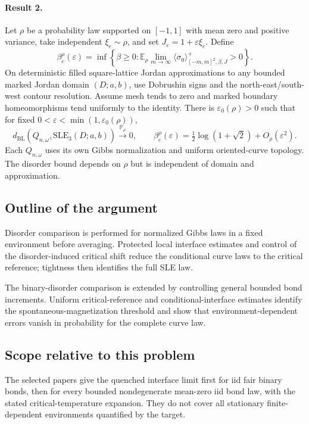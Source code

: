 \documentclass[11pt]{article}
\begin{document}
\paragraph{Result 2.} Let $\rho$ be a probability law supported on $[-1,1]$ with mean zero and positive variance, take independent $\xi_e\sim\rho$, and set $J_e=1+\varepsilon\xi_e$. Define
\[
 \beta_c^\rho(\varepsilon)=\inf\left\{\beta\ge0:
 \mathbb E_\rho\lim_{m\to\infty}\langle\sigma_0\rangle^+_{[-m,m]^2,\beta,J}>0\right\}.
\]
On deterministic filled square-lattice Jordan approximations to any bounded marked Jordan domain $(D;a,b)$, use Dobrushin signs and the north-east/south-west contour resolution. Assume mesh tends to zero and marked boundary homeomorphisms tend uniformly to the identity. There is $\varepsilon_0(\rho)>0$ such that for fixed $0<\varepsilon<\min(1,\varepsilon_0(\rho))$,
\[
 d_{\mathrm{BL}}(Q_{n,\omega},\mathrm{SLE}_3(D;a,b))\xrightarrow{\mathbb P_\rho}0,
 \qquad
 \beta_c^\rho(\varepsilon)=\tfrac12\log(1+\sqrt2)+O_\rho(\varepsilon^2).
\]
Each $Q_{n,\omega}$ uses its own Gibbs normalization and uniform oriented-curve topology. The disorder bound depends on $\rho$ but is independent of domain and approximation.

\subsection{Outline of the argument}
Disorder comparison is performed for normalized Gibbs laws in a fixed environment before averaging. Protected local interface estimates and control of the disorder-induced critical shift reduce the conditional curve laws to the critical reference; tightness then identifies the full SLE law.

The binary-disorder comparison is extended by controlling general bounded bond increments. Uniform critical-reference and conditional-interface estimates identify the spontaneous-magnetization threshold and show that environment-dependent errors vanish in probability for the complete curve law.

\subsection{Scope relative to this problem}
The selected papers give the quenched interface limit first for iid fair binary bonds, then for every bounded nondegenerate mean-zero iid bond law, with the stated critical-temperature expansion. They do not cover all stationary finite-dependent environments quantified by the target.
\end{document}

